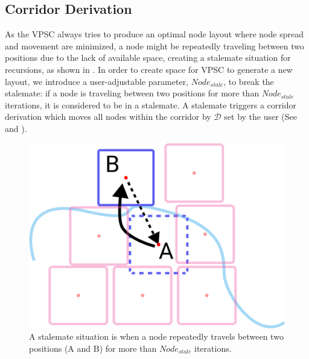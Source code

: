 \subsection{Corridor Derivation}

As the VPSC always tries to produce an optimal node layout where node spread and movement are minimized, a node might be repeatedly traveling between two positions due to the lack of available space, creating a stalemate situation for recursions, as shown in . In order to create space for VPSC to generate a new layout, we introduce a user-adjustable parameter, $ Node_{stale} $, to break the stalemate: if a node is traveling between two positions for more than $ Node_{stale} $ iterations, it is considered to be in a stalemate. A stalemate triggers a corridor derivation which moves all nodes within the corridor by $ \mathcal{D} $ set by the user (See  and ).

{
\begin{figure}[tb!]
    \centering
    \includegraphics[width=\columnwidth]{figure/stalemate.png}
    \caption{A stalemate situation is when a node repeatedly travels between two positions (A and B) for more than $Node_{stale}$ iterations. }
    \label{fig:stalemate}
\end{figure}
}

